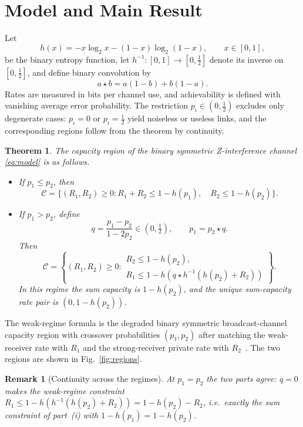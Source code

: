 \documentclass[12pt,draftclsnofoot,onecolumn,conference]{IEEEtran}
\newtheorem{theorem}{Theorem}
\newtheorem{remark}{Remark}
\newcommand{\st}{\star}
\begin{document}
\section{Model and Main Result}

Let
\[
h(x)=-x\log_2x-(1-x)\log_2(1-x),\qquad x\in[0,1],
\]
be the binary entropy function, let
$h^{-1}:[0,1]\to[0,\tfrac12]$ denote its inverse on
$[0,\tfrac12]$, and define binary convolution by
\[
a\st b=a(1-b)+b(1-a).
\]
Rates are measured in bits per channel use, and achievability is defined with
vanishing average error probability. The restriction $p_i\in(0,\tfrac12)$
excludes only degenerate cases: $p_i=0$ or $p_i=\tfrac12$ yield noiseless or
useless links, and the corresponding regions follow from the theorem by
continuity.

\begin{theorem}\label{thm}
The capacity region of the binary symmetric Z-interference channel
\eqref{eq:model} is as follows.
\begin{itemize}
\item[(i)] If $p_1\le p_2$, then
\[
\mathcal C=\bigl\{(R_1,R_2)\ge0:
R_1+R_2\le1-h(p_1),\quad R_2\le1-h(p_2)\bigr\}.
\]
\item[(ii)] If $p_1>p_2$, define
\[
q=\frac{p_1-p_2}{1-2p_2}\in(0,\tfrac12),
\qquad p_1=p_2\st q.
\]
Then
\[
\mathcal C=\left\{(R_1,R_2)\ge0:
\begin{array}{l}
R_2\le1-h(p_2),\\[1mm]
R_1\le1-h\!\left(q\st
h^{-1}\!\left(h(p_2)+R_2\right)\right)
\end{array}
\right\}.
\]
In this regime the sum capacity is $1-h(p_2)$, and the unique
sum-capacity rate pair is $(0,1-h(p_2))$.
\end{itemize}
\end{theorem}

The weak-regime formula is the degraded binary symmetric broadcast-channel
capacity region with crossover probabilities $(p_1,p_2)$ after matching the
weak-receiver rate with $R_1$ and the strong-receiver private rate with
$R_2$~\cite{Wyner73b}. The two regions are shown in
Fig.~\ref{fig:regions}.

\begin{remark}[Continuity across the regimes]
At $p_1=p_2$ the two parts agree: $q=0$ makes the weak-regime constraint
$R_1\le1-h(h^{-1}(h(p_2)+R_2))=1-h(p_2)-R_2$, i.e.\ exactly the sum
constraint of part~(i) with $1-h(p_1)=1-h(p_2)$.
\end{remark}
\end{document}
